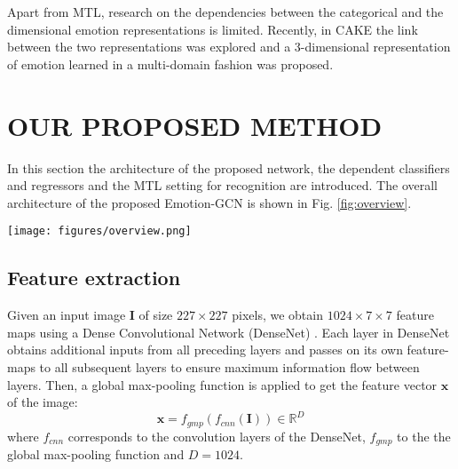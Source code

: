 \documentclass[a4paper, 10pt, conference]{ieeeconf}      \usepackage{FG2021}
\begin{document}
Apart from MTL, research on the dependencies between the categorical and the dimensional emotion representations is limited. Recently, in CAKE \cite{kervadec2018cake} the link between the two representations was explored and a 3-dimensional representation of emotion learned in a multi-domain fashion was proposed.

\section{OUR PROPOSED METHOD}
\label{sec:proposed_method}

In this section the architecture of the proposed network, the dependent classifiers and regressors and the MTL setting for recognition are introduced. The overall architecture of the proposed Emotion-GCN is shown in Fig. \ref{fig:overview}.

\begin{figure*}[t]
    \centering
    \texttt{[image: figures/overview.png]}
    \caption{Overall architecture of our Emotion-GCN model for FER in the wild. Our graph contains the seven expression labels and the two VA dimensions that are connected to each other based on the adjacency matrix $\mathbf{A}$. Stacked GCNs are learned over the graph to map the word embeddings of the nodes $\mathbf{Z}$ into a set of dependent classifiers and regressors, $\mathbf{W^c}$ and $\mathbf{W^r}$ respectively. These vectors are then applied to an image representation $\mathbf{x}$ extracted from the input image $\mathbf{I}$ via a DenseNet $\mathbf{f_{cnn}}$ followed by a global max-pooling function $\mathbf{f_{gmp}}$. The whole network is trained end-to-end for both basic expression classification ($\mathbf{L^c}$) and VA regression ($\mathbf{L^r}$).}
    \label{fig:overview}
\end{figure*}

\subsection{Feature extraction}

Given an input image $\mathbf{I}$ of size $227 \times 227$ pixels, we obtain $1024 \times 7 \times 7$ feature maps using a Dense Convolutional Network (DenseNet) \cite{huang2017densely}. Each layer in DenseNet obtains additional inputs from all preceding layers and passes on its own feature-maps to all subsequent layers to ensure maximum information flow between layers. Then, a global max-pooling function is applied to get the feature vector $\mathbf{x}$ of the image:
\begin{equation}
    \mathbf{x} = f_{gmp}(f_{cnn}(\mathbf{I})) \in \mathbb{R}^{D}
\end{equation}
where $f_{cnn}$ corresponds to the convolution layers of the DenseNet, $f_{gmp}$ to the the global max-pooling function and $D = 1024$.
\end{document}
